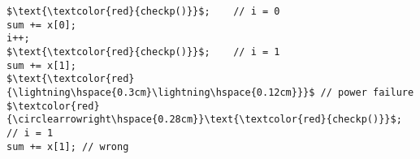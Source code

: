 \documentclass[border={20pt 5pt 10pt 10pt}]{standalone} %
\begin{document}
\begin{lstlisting}[style=mystyle, linewidth=115px]
$\text{\textcolor{red}{checkp()}}$;    // i = 0
sum += x[0];
i++;
$\text{\textcolor{red}{checkp()}}$;    // i = 1
sum += x[1];
$\text{\textcolor{red}{\lightning\hspace{0.3cm}\lightning\hspace{0.12cm}}}$ // power failure
$\textcolor{red}{\circlearrowright\hspace{0.28cm}}\text{\textcolor{red}{checkp()}}$; // i = 1
sum += x[1]; // wrong
\end{lstlisting}
\end{document}
